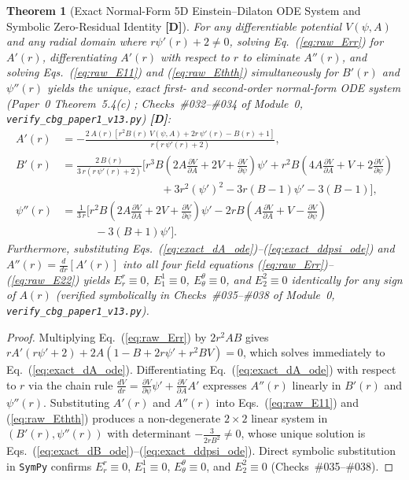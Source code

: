 \documentclass[11pt,a4paper]{article}
\newcommand{\catD}{\textbf{\textcolor{blue!75!black}{[D]}}}
\newtheorem{theorem}{Theorem}[section]
\theoremstyle{definition}
\theoremstyle{remark}
\begin{document}
\begin{theorem}[Exact Normal-Form 5D Einstein--Dilaton ODE System and Symbolic Zero-Residual Identity \catD]
\label{thm:exact_5d_odes}
For any differentiable potential $V(\psi,A)$ and any radial domain where $r\psi'(r) + 2 \neq 0$, solving Eq.~(\ref{eq:raw_Err}) for $A'(r)$, differentiating $A'(r)$ with respect to $r$ to eliminate $A''(r)$, and solving Eqs.~(\ref{eq:raw_E11}) and (\ref{eq:raw_Ethth}) simultaneously for $B'(r)$ and $\psi''(r)$ yields the unique, exact first- and second-order normal-form ODE system (Paper~0 Theorem~5.4(c) \cite{JV_Paper0}; Checks~\#032--\#034 of Module~0, \texttt{verify\_cbg\_paper1\_v13.py}) \catD:
\begin{align}
  A'(r) &= -\frac{2\,A(r)\left[r^2 B(r)\,V(\psi,A) + 2 r\,\psi'(r) - B(r) + 1\right]}{r\left(r\,\psi'(r) + 2\right)}, \label{eq:exact_dA_ode} \\[6pt]
  B'(r) &= \frac{2\,B(r)}{3\,r\left(r\,\psi'(r) + 2\right)}\Bigg[r^3 B\left(2 A\frac{\partial V}{\partial A} + 2 V + \frac{\partial V}{\partial\psi}\right)\psi' + r^2 B\left(4 A\frac{\partial V}{\partial A} + V + 2\frac{\partial V}{\partial\psi}\right) \nonumber \\[3pt]
  &\qquad\qquad\qquad\qquad\quad + 3 r^2(\psi')^2 - 3 r(B - 1)\psi' - 3(B - 1)\Bigg], \label{eq:exact_dB_ode} \\[6pt]
  \psi''(r) &= \frac{1}{3\,r}\Bigg[r^2 B\left(2 A\frac{\partial V}{\partial A} + 2 V + \frac{\partial V}{\partial\psi}\right)\psi' - 2 r B\left(A\frac{\partial V}{\partial A} + V - \frac{\partial V}{\partial\psi}\right) \nonumber \\[3pt]
  &\qquad\quad - 3(B + 1)\psi'\Bigg]. \label{eq:exact_ddpsi_ode}
\end{align}
Furthermore, substituting Eqs.~(\ref{eq:exact_dA_ode})--(\ref{eq:exact_ddpsi_ode}) and $A''(r) = \frac{d}{dr}[A'(r)]$ into all four field equations (\ref{eq:raw_Err})--(\ref{eq:raw_E22}) yields $E^r_r \equiv 0$, $E^1_1 \equiv 0$, $E^{\theta}_{\theta} \equiv 0$, and $E^2_2 \equiv 0$ identically for any sign of $A(r)$ (verified symbolically in Checks~\#035--\#038 of Module~0, \allowbreak\texttt{verify\_cbg\_paper1\_v13.py}).
\end{theorem}

\begin{proof}
Multiplying Eq.~(\ref{eq:raw_Err}) by $2 r^2 A B$ gives $r A'(r\psi' + 2) + 2 A(1 - B + 2r\psi' + r^2 B V) = 0$, which solves immediately to Eq.~(\ref{eq:exact_dA_ode}). Differentiating Eq.~(\ref{eq:exact_dA_ode}) with respect to $r$ via the chain rule $\frac{dV}{dr} = \frac{\partial V}{\partial\psi}\psi' + \frac{\partial V}{\partial A}A'$ expresses $A''(r)$ linearly in $B'(r)$ and $\psi''(r)$. Substituting $A'(r)$ and $A''(r)$ into Eqs.~(\ref{eq:raw_E11}) and (\ref{eq:raw_Ethth}) produces a non-degenerate $2\times 2$ linear system in $(B'(r), \psi''(r))$ with determinant $-\frac{3}{2 r B^2} \neq 0$, whose unique solution is Eqs.~(\ref{eq:exact_dB_ode})--(\ref{eq:exact_ddpsi_ode}). Direct symbolic substitution in \texttt{SymPy} confirms $E^r_r \equiv 0$, $E^1_1 \equiv 0$, $E^{\theta}_{\theta} \equiv 0$, and $E^2_2 \equiv 0$ (Checks~\#035--\#038).
\end{proof}
\end{document}
